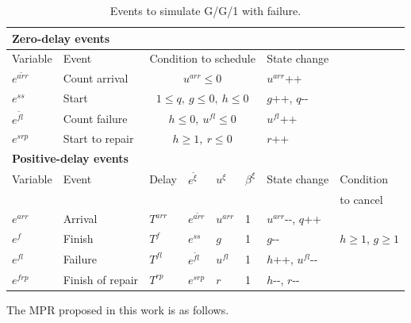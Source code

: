 \documentclass[]{interact}
\theoremstyle{plain}%
\theoremstyle{definition}
\theoremstyle{remark}
\begin{document}
\begin{table}[h]
	\begin{tabular}{llllllll} 
		\multicolumn{8}{l}{\textbf{Zero-delay events}}\\ \hline
		Variable&Event &  \multicolumn{4}{c}{Condition to schedule} & State change&\\\hline
		$e^{\tilde{arr}}$ & Count arrival &  \multicolumn{4}{c}{$u^{arr}\le 0$} & $u^{arr}${\footnotesize++}& \\
		$e^{ss}$&Start&  \multicolumn{4}{c}{$1\le q,\ g\le 0,\ h\le 0$} &$g${\footnotesize++}, $q${\small-}{\small-}&  \\
		$e^{\tilde{fl}}$& Count failure &  \multicolumn{4}{c}{$h\le 0,\ u^{fl}\le 0$} & $u^{fl}${\footnotesize++}& \\
		$e^{srp}$&Start to repair&\multicolumn{4}{c}{$h\ge 1,\ r\le 0$}&  $r${\footnotesize++}&  \\
		\multicolumn{8}{l}{\textbf{Positive-delay events}}\\ \hline
		Variable&Event 		   & Delay& $e^{\tilde{\xi}}$& $u^{\xi}$ &$\beta^{\xi}$& State change&Condition \\
		&&&&&&&to cancel\\\hline
		$e^{arr}$&Arrival & $T^{arr}$& $e^{\tilde{arr}}$&  $u^{arr}$&1&  $u^{arr}${\small-}{\small-},  $q${\footnotesize++}&\\	
		$e^{f}$&Finish & $T^{f}$& $e^{ss}$&  $g$&1&  $g${\small-}{\small-}&$h\ge 1$, $g\ge 1$\\	
		$e^{fl}$&Failure & $T^{fl}$& $e^{\tilde{fl}}$&  $u^{fl}$&1&   $h${\footnotesize++}, $u^{fl}${\small-}{\small-}&\\	
		$e^{frp}$&Finish of repair & $T^{rp}$& $e^{srp}$&  $r$&1&   $h${\small-}{\small-}, $r${\small-}{\small-}&\\	\hline
	\end{tabular}
	\caption{Events to simulate G/G/1 with failure.}
	\label{tab:failure}
\end{table}


The MPR proposed in this work is as follows.
\end{document}
